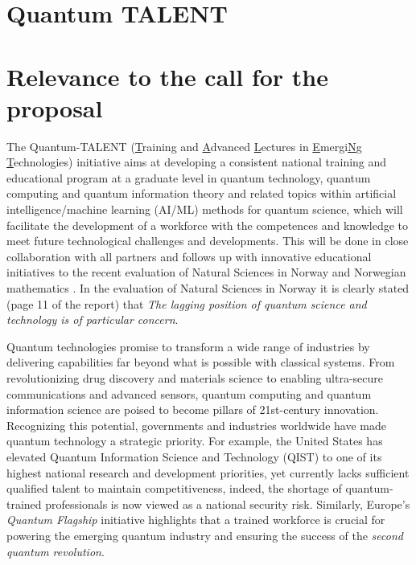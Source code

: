 \documentclass{scrreprt}
\author{Oslo Metropolitan University}
\date{\today}
\title{}
\begin{document}
\section*{\LARGE{Quantum TALENT}}





\section{Relevance to the call for the proposal}

The Quantum-TALENT (\underline{T}raining and \underline{A}dvanced
\underline{L}ectures in \underline{E}mergi\underline{N}g
\underline{T}echnologies) initiative aims at developing a consistent national training and
educational program at a graduate  level in quantum technology, quantum
computing and quantum information theory and related topics within  artificial
intelligence/machine learning (AI/ML) methods for quantum science,
which will facilitate the development of a workforce with the
competences and knowledge to meet future technological challenges and
developments. This will  be done in close collaboration with all
partners and follows up with innovative educational initiatives  to the recent evaluation of Natural Sciences in Norway and Norwegian mathematics \cite{evalnat,evalmat}.  In the evaluation of Natural Sciences in Norway \cite{evalnat} it is clearly stated (page 11 of the report) that \textit{The lagging
position of quantum science and technology is of particular concern}. 


Quantum technologies promise to transform a wide range of industries
by delivering capabilities far beyond what is possible with classical
systems. From revolutionizing drug discovery and materials science to
enabling ultra-secure communications and advanced sensors, quantum
computing and quantum information science are poised to become pillars
of 21st-century innovation. Recognizing this potential, governments
and industries worldwide have made quantum technology a strategic
priority. For example, the United States has elevated Quantum
Information Science and Technology (QIST) \cite{usquantum} to one of its highest
national research and development priorities, yet currently lacks
sufficient qualified talent to maintain competitiveness, indeed, the
shortage of quantum-trained professionals is now viewed as a national
security risk. Similarly, Europe’s \textit{Quantum Flagship} \cite{euquantum}
initiative highlights that a trained workforce is crucial for powering
the emerging quantum industry and ensuring the success of the {\em
  second quantum revolution}.
\end{document}
